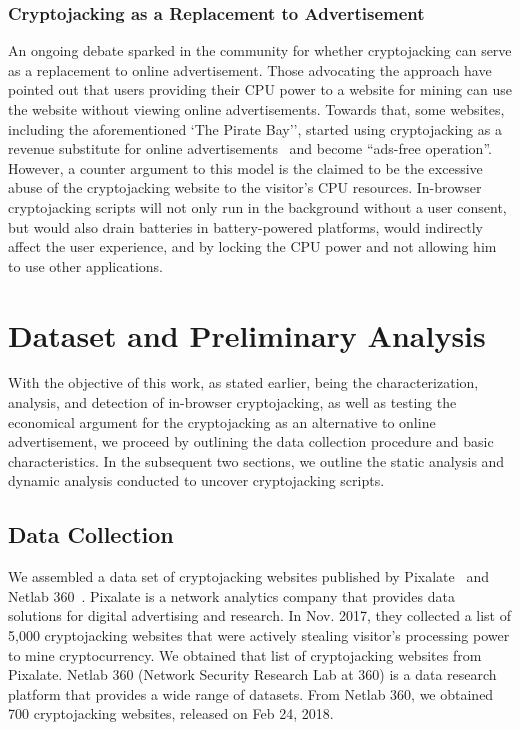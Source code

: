 \documentclass[acmlarge]{acmart}
\newcommand{\vs}[1]{{\vspace{-#1mm}}}
\newcommand{\cj}{cryptojacking\xspace}
\begin{document}
\vs{0}
\subsubsection{Cryptojacking as a Replacement to Advertisement} \label{sec:adcj}
An ongoing debate sparked in the community for whether \cj can serve as a replacement to online advertisement. Those advocating the approach have pointed out that users providing their CPU power to a website for mining can use the website without viewing online advertisements. Towards that, some websites, including the aforementioned `The Pirate Bay'', started using \cj as a revenue substitute for online advertisements~\cite{Shaikh_17,Ernesto_17,Jones_2017} and become ``ads-free operation''. However, a counter argument to this model is the claimed to be the excessive abuse of the \cj website to the visitor's CPU resources. In-browser \cj scripts will not only run in the background without a user consent, but would also drain batteries in battery-powered platforms, would indirectly affect the user experience, and by locking the CPU power and not allowing him to use other applications. 

\section{Dataset and Preliminary Analysis}\label{sec:prelim}
With the objective of this work, as stated earlier, being the characterization, analysis, and detection of in-browser \cj, as well as testing the economical argument for the \cj as an alternative to online advertisement, we proceed by outlining the data collection procedure and basic characteristics. In the subsequent two sections, we outline the static analysis and dynamic analysis conducted to uncover \cj scripts. 

\subsection{Data Collection} \label{sec:data}
We assembled a data set of \cj websites published by  Pixalate~\cite{Loechner17} and Netlab 360~\cite{Netlab360}. Pixalate is a network analytics company that provides data solutions for digital advertising and research. In Nov. 2017, they collected
a list of 5,000 cryptojacking websites that were actively stealing visitor’s processing power to mine cryptocurrency. We obtained that list of cryptojacking websites from Pixalate. Netlab 360 (Network Security Research Lab at 360) is a data research platform that provides a wide range of datasets. From Netlab 360, we obtained  700 \cj websites, released on Feb 24, 2018. 
\end{document}
